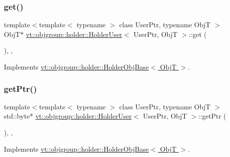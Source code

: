 \subsubsection{\texorpdfstring{get()}{get()}}
{\footnotesize\ttfamily template$<$template$<$ typename $>$ class User\+Ptr, typename ObjT $>$ \\
ObjT$\ast$ \hyperlink{structvt_1_1objgroup_1_1holder_1_1_holder_user}{vt\+::objgroup\+::holder\+::\+Holder\+User}$<$ User\+Ptr, ObjT $>$\+::get (\begin{DoxyParamCaption}{ }\end{DoxyParamCaption})\hspace{0.3cm}{\ttfamily [inline]}, {\ttfamily [override]}, {\ttfamily [virtual]}}



Implements \hyperlink{structvt_1_1objgroup_1_1holder_1_1_holder_obj_base_a4b350b0126259d31a62fd426a08f6698}{vt\+::objgroup\+::holder\+::\+Holder\+Obj\+Base$<$ Obj\+T $>$}.

\mbox{\label{structvt_1_1objgroup_1_1holder_1_1_holder_user_a85c5a7613142e86a830a0b5103f83ce4}} 
\subsubsection{\texorpdfstring{get\+Ptr()}{getPtr()}}
{\footnotesize\ttfamily template$<$template$<$ typename $>$ class User\+Ptr, typename ObjT $>$ \\
std\+::byte$\ast$ \hyperlink{structvt_1_1objgroup_1_1holder_1_1_holder_user}{vt\+::objgroup\+::holder\+::\+Holder\+User}$<$ User\+Ptr, ObjT $>$\+::get\+Ptr (\begin{DoxyParamCaption}{ }\end{DoxyParamCaption})\hspace{0.3cm}{\ttfamily [inline]}, {\ttfamily [override]}, {\ttfamily [virtual]}}



Implements \hyperlink{structvt_1_1objgroup_1_1holder_1_1_holder_obj_base_abd46e1aa84c0fea2554bf19029581e01}{vt\+::objgroup\+::holder\+::\+Holder\+Obj\+Base$<$ Obj\+T $>$}.

\mbox{\label{structvt_1_1objgroup_1_1holder_1_1_holder_user_a4a43e5b38a0474cd523ccd9aa66950e9}} 
